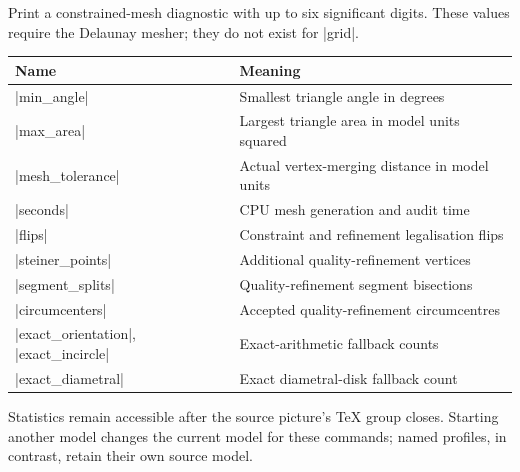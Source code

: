 \begin{command}{\femmmeshstat{}}
Print a constrained-mesh diagnostic with up to six significant digits.
These values require the Delaunay mesher; they do not exist for |grid|.
\end{command}
\begin{center}
\begin{tabular}{ll}
\toprule Name & Meaning \\
\midrule
|min_angle| & Smallest triangle angle in degrees \\
|max_area| & Largest triangle area in model units squared \\
|mesh_tolerance| & Actual vertex-merging distance in model units \\
|seconds| & CPU mesh generation and audit time \\
|flips| & Constraint and refinement legalisation flips \\
|steiner_points| & Additional quality-refinement vertices \\
|segment_splits| & Quality-refinement segment bisections \\
|circumcenters| & Accepted quality-refinement circumcentres \\
|exact_orientation|, |exact_incircle| & Exact-arithmetic fallback counts \\
|exact_diametral| & Exact diametral-disk fallback count \\
\bottomrule
\end{tabular}
\end{center}
Statistics remain accessible after the source picture's TeX group closes.
Starting another model changes the current model for these commands;
named profiles, in contrast, retain their own source model.
